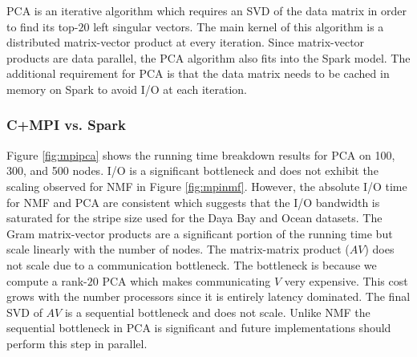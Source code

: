 PCA is an iterative algorithm which requires an SVD of the data matrix in order to find its top-$20$ left singular vectors. The main kernel of this algorithm is a distributed matrix-vector product at every iteration. Since matrix-vector products are data parallel, the PCA algorithm also fits into the Spark model. The additional requirement for PCA is that the data matrix needs to be cached in memory on Spark to avoid I/O at each iteration.

\subsubsection{C+MPI vs. Spark}
Figure \ref{fig:mpipca} shows the running time breakdown results for PCA on 100, 300, and 500 nodes. I/O is a significant bottleneck and does not exhibit the scaling observed for NMF in Figure \ref{fig:mpinmf}. However, the absolute I/O time for NMF and PCA are consistent which suggests that the I/O bandwidth is saturated for the stripe size used for the Daya Bay and Ocean datasets. The Gram matrix-vector products are a significant portion of the running time but scale linearly with the number of nodes. The matrix-matrix product ($AV$) does not scale due to a communication bottleneck. The bottleneck is because we compute a rank-$20$ PCA which makes communicating $V$ very expensive. This cost grows with the number processors since it is entirely latency dominated. The final SVD of $AV$ is a sequential bottleneck and does not scale. Unlike NMF the sequential bottleneck in PCA is significant and future implementations should perform this step in parallel.

